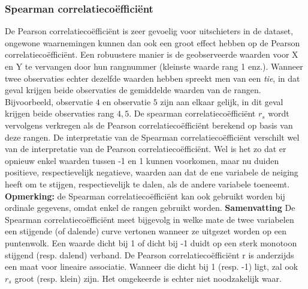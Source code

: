\documentclass[titlepage]{article}
\numberwithin{equation}{section}
\begin{document}
 \subsubsection{Spearman correlatiecoëfficiënt}
 De Pearson correlatiecoëfficiënt is zeer gevoelig voor uitschieters in de dataset, ongewone waarnemingen kunnen dan ook een groot effect hebben op de Pearson correlatiecoëfficiënt.\newline\newline
 Een robuustere manier is de geobserveerde waarden voor X en Y te vervangen door hun rangnummer (kleinste waarde rang 1 enz.). Wanneer twee observaties echter dezelfde waarden hebben spreekt men van een \textit{tie}, in dat geval krijgen beide observaties de gemiddelde waarden van de rangen. Bijvoorbeeld, observatie $4$ en observatie $5$ zijn aan elkaar gelijk, in dit geval krijgen beide observaties rang $4,5$. De spearman correlatiecoëfficiënt $r_{s}$ wordt vervolgens verkregen als de Pearson correlatiecoëfficiënt berekend op basis van deze rangen.\newline\newline
 De interpretatie van de Spearman correlatiecoëfficiënt verschilt wel van de interpretatie van de Pearson correlatiecoëfficiënt. Wel is het zo dat er opnieuw enkel waarden tussen -1 en 1 kunnen voorkomen, maar nu duiden positieve, respectievelijk negatieve, waarden aan dat de ene variabele de neiging heeft om te stijgen, respectievelijk te dalen, als de andere variabele toeneemt.\newline\newline
 \textbf{Opmerking:} de Spearman correlatiecoëfficiënt kan ook gebruikt worden bij ordinale gegevens, omdat enkel de rangen gebruikt worden.\newline\newline
 \textbf{Samenvatting}\newline
 De Spearman correlatiecoëfficiënt meet bijgevolg in welke mate de twee variabelen een stijgende (of dalende) curve vertonen wanneer ze uitgezet worden op een puntenwolk. Een waarde dicht bij 1 of dicht bij -1 duidt op een sterk monotoon stijgend (resp. dalend) verband.\newline
 De Pearson correlatiecoëfficiënt r is anderzijds een maat voor lineaire associatie. Wanneer die dicht bij 1 (resp. -1) ligt, zal ook $r_{s}$ groot (resp. klein) zijn. Het omgekeerde is echter niet noodzakelijk waar.
\end{document}
